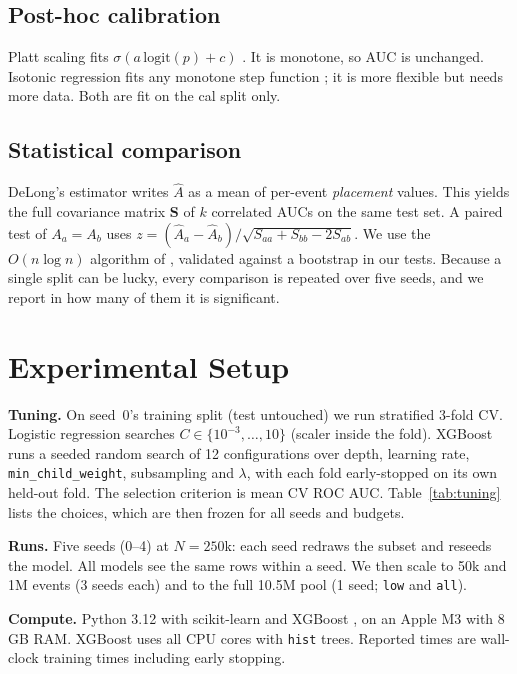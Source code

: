 \documentclass[conference]{IEEEtran}
\begin{document}
\subsection{Post-hoc calibration}
Platt scaling fits $\sigma(a\,\mathrm{logit}(p)+c)$ \cite{platt1999probabilistic}. It is monotone, so
AUC is unchanged. Isotonic regression fits any monotone step function \cite{zadrozny2002transforming};
it is more flexible but needs more data. Both are fit on the cal split only.

\subsection{Statistical comparison}
DeLong's estimator \cite{delong1988comparing} writes $\hat A$ as a mean of per-event \emph{placement}
values. This yields the full covariance matrix $\mathbf S$ of $k$ correlated AUCs on the same test
set. A paired test of $A_a=A_b$ uses $z=(\hat A_a-\hat A_b)/\sqrt{S_{aa}+S_{bb}-2S_{ab}}$. We use the
$O(n\log n)$ algorithm of \cite{sun2014fast}, validated against a bootstrap in our tests. Because a
single split can be lucky, every comparison is repeated over five seeds, and we report in how many of
them it is significant.

\section{Experimental Setup}\label{sec:setup}
\textbf{Tuning.} On seed~0's training split (test untouched) we run stratified 3-fold CV.
Logistic regression searches $C\in\{10^{-3},\dots,10\}$ (scaler inside the fold). XGBoost runs a
seeded random search of 12 configurations over depth, learning rate, \texttt{min\_child\_weight},
subsampling and $\lambda$, with each fold early-stopped on its own held-out fold. The selection
criterion is mean CV ROC AUC. Table~\ref{tab:tuning} lists the choices, which are then frozen for all
seeds and budgets.

\textbf{Runs.} Five seeds (0--4) at $N=250$k: each seed redraws the subset and reseeds the model. All
models see the same rows within a seed. We then scale to 50k and 1M events (3 seeds each) and to the
full 10.5M pool (1 seed; \texttt{low} and \texttt{all}).

\textbf{Compute.} Python 3.12 with scikit-learn \cite{pedregosa2011scikit} and XGBoost
\cite{chen2016xgboost}, on an Apple M3 with 8\,GB RAM. XGBoost uses all CPU cores with \texttt{hist}
trees.
Reported times are wall-clock training times including early stopping.
\end{document}
